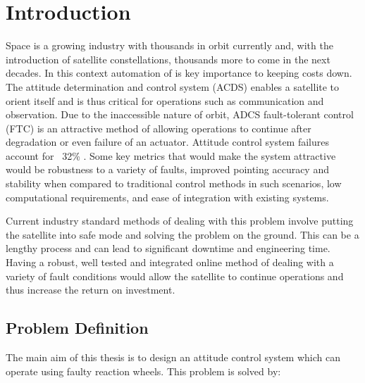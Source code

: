 \graphicspath{{introduction/fig/}}

\chapter{Introduction}
\label{chap:introduction}

Space is a growing industry with thousands in orbit currently and, with the introduction of satellite constellations, thousands more to come in the next decades. In this context automation of is key importance to keeping costs down. The attitude determination and control system (ACDS) enables a satellite to orient itself and is thus critical for operations such as communication and observation. Due to the inaccessible nature of orbit, ADCS fault-tolerant control (FTC) is an attractive method of allowing operations to continue after degradation or even failure of an actuator. Attitude control system failures account for ~32\%  \cite{yinReviewRecentDevelopment2016}. Some key metrics that would make the system attractive would be robustness to a variety of faults, improved pointing accuracy and stability when compared to traditional control methods in such scenarios, low computational requirements, and ease of integration with existing systems.

Current industry standard methods of dealing with this problem involve putting the satellite into safe mode and solving the problem on the ground. This can be a lengthy process and can lead to significant downtime and engineering time. Having a robust, well tested and integrated online method of dealing with a variety of fault conditions would allow the satellite to continue operations and thus increase the return on investment.

\section{Problem Definition}

The main aim of this thesis is to design an attitude control system which can operate using faulty reaction wheels. This problem is solved by:

